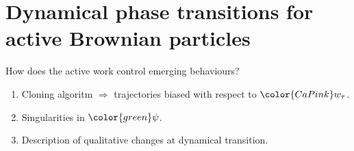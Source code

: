 \documentclass{beamer}
\begin{document}
\section{Dynamical phase transitions for active Brownian particles}

\begin{frame}{How does the active work control emerging behaviours?}

\pause
\begin{enumerate}[<+->]
  \item Cloning algoritm $\Rightarrow$ trajectories biased with respect to $\color{CaPink} w_{\tau}$.
  \item Singularities in $\color{green} \psi$.
  \item Description of qualitative changes at dynamical transition.
\end{enumerate}


\end{frame}
\end{document}
